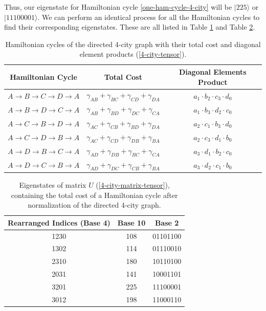 \documentclass[msc,oneside]{ubcthesis}
\begin{document}
Thus, our eigenstate for Hamiltonian cycle \eqref{one-ham-cycle-4-city} will be $|225\rangle$ or $|11100001\rangle$. We can perform an identical process for all the Hamiltonian cycles to find their corresponding eigenstates. These are all listed in Table \ref{table:ham-cycle-details-4-city} and Table \ref{table:4-city-conversions}.
	
	
	\begin{table}[h]
		\centering
		\begin{tabular}{|c|c|c|}
			\hline
			\textbf{Hamiltonian Cycle} & \textbf{Total Cost} & \textbf{Diagonal Elements Product} \\
			\hline
			$A \rightarrow B \rightarrow C \rightarrow D \rightarrow A$ & $\gamma_{AB} + \gamma_{BC} + \gamma_{CD} + \gamma_{DA}$ & $a_{1} \cdot b_{2} \cdot c_{3} \cdot d_{0}$ \\
			$A \rightarrow B \rightarrow D \rightarrow C \rightarrow A$ & $\gamma_{AB} + \gamma_{BD} + \gamma_{DC} + \gamma_{CA}$ & $a_{1} \cdot b_{3} \cdot d_{2} \cdot c_{0}$ \\
			$A \rightarrow C \rightarrow B \rightarrow D \rightarrow A$ & $\gamma_{AC} + \gamma_{CB} + \gamma_{BD} + \gamma_{DA}$ & $a_{2} \cdot c_{1} \cdot b_{3} \cdot d_{0}$ \\
			$A \rightarrow C \rightarrow D \rightarrow B \rightarrow A$ & $\gamma_{AC} + \gamma_{CD} + \gamma_{DB} + \gamma_{BA}$ & $a_{2} \cdot c_{3} \cdot d_{1} \cdot b_{0}$ \\
			$A \rightarrow D \rightarrow B \rightarrow C \rightarrow A$ & $\gamma_{AD} + \gamma_{DB} + \gamma_{BC} + \gamma_{CA}$ & $a_{3} \cdot d_{1} \cdot b_{2} \cdot c_{0}$ \\
			$A \rightarrow D \rightarrow C \rightarrow B \rightarrow A$ & $\gamma_{AD} + \gamma_{DC} + \gamma_{CB} + \gamma_{BA}$ & $a_{3} \cdot d_{2} \cdot c_{1} \cdot b_{0}$ \\
			\hline
			\end{tabular}
					\caption{Hamiltonian cycles of the directed 4-city graph with their total cost and diagonal element products (\ref{4-city-tensor}).}
			\label{table:ham-cycle-details-4-city}
	\end{table}
	\begin{table}[h]
		\centering
		\begin{tabular}{|c|c|c|}	
			
			\hline
			\textbf{Rearranged Indices (Base 4)} & \textbf{Base 10} & \textbf{Base 2} \\
			\hline
			1230 & 108 & 01101100 \\
			1302 & 114 & 01110010 \\
			2310 & 180 & 10110100 \\
			2031 & 141 & 10001101 \\
			3201 & 225 & 11100001 \\
			3012 & 198 & 11000110 \\
			\hline
		\end{tabular}
		\caption{Eigenstates of matrix $U$ (\ref{4-city-matrix-tensor}), containing the total cost of a Hamiltonian cycle after normalization of the directed 4-city graph.}
		\label{table:4-city-conversions}
	\end{table}
	
\end{document}
